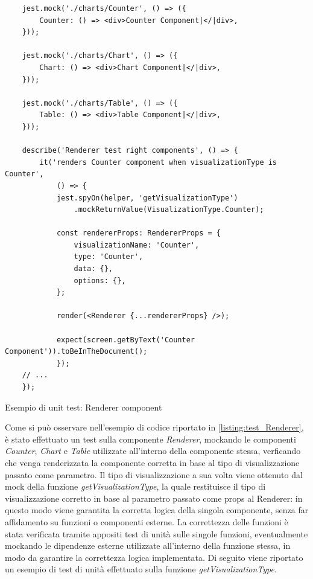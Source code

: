\begin{listing}[H]
    \begin{verbatim}
    jest.mock('./charts/Counter', () => ({
        Counter: () => <div>Counter Component|</|div>,
    }));

    jest.mock('./charts/Chart', () => ({
        Chart: () => <div>Chart Component|</|div>,
    }));

    jest.mock('./charts/Table', () => ({
        Table: () => <div>Table Component|</|div>,
    }));

    describe('Renderer test right components', () => {
        it('renders Counter component when visualizationType is Counter', 
            () => {
            jest.spyOn(helper, 'getVisualizationType')
                .mockReturnValue(VisualizationType.Counter);

            const rendererProps: RendererProps = {
                visualizationName: 'Counter',
                type: 'Counter',
                data: {},
                options: {},
            };

            render(<Renderer {...rendererProps} />);

            expect(screen.getByText('Counter Component')).toBeInTheDocument();
            });
    // ...
    });
    \end{verbatim}
    \caption{Esempio di unit test: Renderer component}
    \label{listing:test_Renderer}
\end{listing}

Come si può osservare nell'esempio di codice riportato in \ref{listing:test_Renderer}, è stato effettuato un test sulla componente \textit{Renderer},
mockando le componenti \textit{Counter}, \textit{Chart} e \textit{Table} utilizzate all'interno della componente stessa, verficando che venga renderizzata
la componente corretta in base al tipo di visualizzazione passato come parametro. \newline
Il tipo di visualizzazione a sua volta viene ottenuto dal mock della funzione \textit{getVisualizationType}, la quale restituisce il tipo di visualizzazione
corretto in base al parametro passato come props al Renderer: in questo modo viene garantita la corretta logica della singola componente, senza far affidamento
su funzioni o componenti esterne. \newline
La correttezza delle funzioni è stata verificata tramite appositi test di unità sulle singole funzioni, eventualmente mockando le dipendenze esterne utilizzate
all'interno della funzione stessa, in modo da garantire la correttezza logica implementata. \newline
Di seguito viene riportato un esempio di test di unità effettuato sulla funzione \textit{getVisualizationType}.

